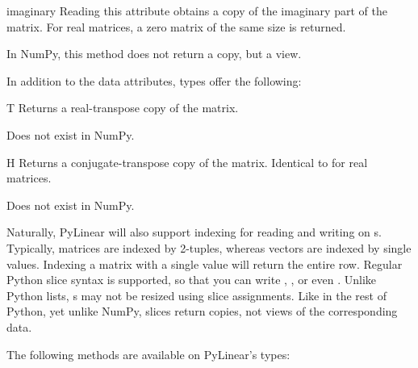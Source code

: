 \begin{memberdesc}[Array]{imaginary}
  Reading this attribute obtains a copy of the imaginary part of the matrix.
  For real matrices, a zero matrix of the same size is returned.

  In NumPy, this method does not return a copy, but a view.
\end{memberdesc}

In addition to the  data attributes,  types
offer the following:

\begin{memberdesc}[Matrix]{T}
  Returns a real-transpose copy of the matrix.

  Does not exist in NumPy.
\end{memberdesc}

\begin{memberdesc}[Matrix]{H}
  Returns a conjugate-transpose copy of the matrix.
  Identical to  for real matrices.

  Does not exist in NumPy.
\end{memberdesc}

Naturally, PyLinear will also support indexing for reading and writing
on s. Typically, matrices are indexed by 2-tuples,
whereas vectors are indexed by single values. Indexing a matrix with a
single value will return the entire row. Regular Python slice syntax
is supported, so that you can write , ,
or even . Unlike Python lists, s may not be
resized using slice assignments. Like in the rest of Python, yet
unlike NumPy, slices return copies, not views of the corresponding
data.

The following methods are available on PyLinear's  types:

